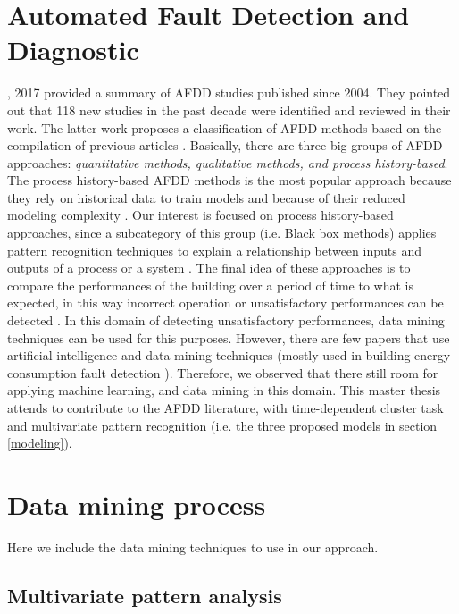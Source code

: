 \section{Automated Fault Detection and Diagnostic}

\citeauthor{kim2017review}, 2017 \cite{kim2017review} provided a summary of AFDD studies published since 2004. They pointed out that 118 new studies in the past decade were identified and reviewed in their work. The latter work proposes a classification of AFDD methods based on the compilation of previous articles \cite{katipamula2005methods1,katipamula2005methods2}. Basically, there are three big groups of AFDD approaches: \textit{quantitative methods, qualitative methods, and process history-based}. The process history-based AFDD methods
is the most popular approach because they rely on historical data to train models and because of their reduced modeling complexity \cite{kim2017review,katipamula2005methods1}. Our interest is focused on process history-based approaches, since a subcategory of this group (i.e. Black box methods) applies pattern recognition techniques to explain a relationship
between inputs and outputs of a process or a system \cite{kim2017review}. The final idea of these approaches is to  compare the performances of the building over a period of time to what is expected, in this way incorrect operation or unsatisfactory performances can be detected \cite{capozzoli2015fault,katipamula2005methods1}. In this domain of detecting unsatisfactory performances, data mining techniques can be used for this purposes. However, there are few papers that use artificial intelligence and data mining techniques (mostly used in building energy consumption fault detection \cite{capozzoli2015fault,miller2015forensically}). Therefore, we observed  that there still room for applying machine learning, and data mining in this domain. This master thesis attends to contribute to the AFDD literature, with time-dependent cluster task and multivariate pattern recognition (i.e. the three proposed models in section \ref{modeling}).      
  

\section{Data mining process}

Here we include the data mining techniques to use in our approach.

\subsection{Multivariate pattern analysis}
\label{sec:MVA}

